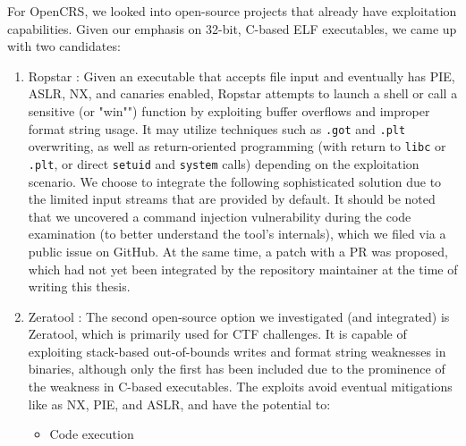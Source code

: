 \documentclass[../main.tex]{subfiles}
\begin{document}
For OpenCRS, we looked into open-source projects that already have exploitation
capabilities. Given our emphasis on 32-bit, C-based ELF executables, we came up
with two candidates:

\begin{enumerate}
      \def\labelenumi{\arabic{enumi}.}
      \item
            Ropstar : Given an executable that accepts file input and
            eventually has PIE, ASLR, NX, and canaries enabled, Ropstar attempts
            to launch a shell or call a sensitive (or "win"") function by
            exploiting buffer overflows and improper format string usage. It may
            utilize techniques such as \texttt{.got} and \texttt{.plt}
            overwriting, as well as return-oriented programming (with return to
            \texttt{libc} or \texttt{.plt}, or direct \texttt{setuid} and
            \texttt{system} calls) depending on the exploitation scenario. We
            choose to integrate the following sophisticated solution due to the
            limited input streams that are provided by default. It should be noted
            that we uncovered a command injection vulnerability during the code
            examination (to better understand the tool's internals), which we
            filed via a public issue  on GitHub. At the same time, a patch
            with a PR  was proposed, which had not yet been integrated by
            the repository maintainer at the time of writing this thesis.
      \item
            Zeratool \cite{zeratool}: The second open-source option we investigated (and
            integrated) is Zeratool, which is primarily used for CTF challenges.
            It is capable of exploiting stack-based out-of-bounds writes and
            format string weaknesses in binaries, although only the first has been
            included due to the prominence of the weakness in C-based executables.
            The exploits avoid eventual mitigations like as NX, PIE, and ASLR, and
            have the potential to:

            \begin{itemize}
                  \tightlist
                  \item
                        Code execution


\end{itemize}
\end{enumerate}
\end{document}
